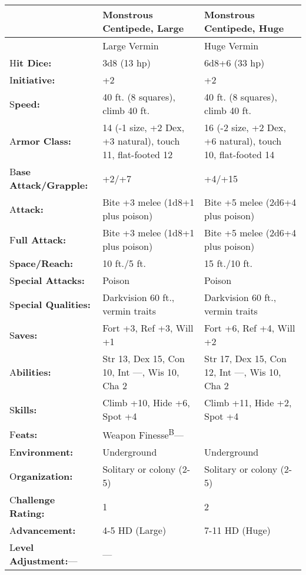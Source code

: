 \documentclass{article}
\begin{document}
\vspace{12pt}
\begin{tabular}{|>{\raggedright}p{59pt}|>{\raggedright}p{127pt}|>{\raggedright}p{127pt}|}
\hline
  & M\textbf{onstrous Centipede, Large} & M\textbf{onstrous Centipede, Huge}\tabularnewline
\hline
  & Large Vermin & Huge Vermin\tabularnewline
\hline
H\textbf{it Dice:} & 3d8 (13 hp) & 6d8+6 (33 hp)\tabularnewline
\hline
I\textbf{nitiative:} & +2 & +2\tabularnewline
\hline
S\textbf{peed:} & 40 ft. (8 squares), climb 40 ft. & 40 ft. (8 squares), climb 
40 ft.\tabularnewline
\hline
A\textbf{rmor Class:} & 14 (-1 size, +2 Dex, +3 natural), touch 11, flat-footed 
12 & 16 (-2 size, +2 Dex, +6 natural), touch 10, flat-footed 14\tabularnewline
\hline
B\textbf{ase Attack/Grapple:} & +2/+7 & +4/+15\tabularnewline
\hline
A\textbf{ttack:} & Bite +3 melee (1d8+1 plus poison) & Bite +5 melee (2d6+4 plus 
poison)\tabularnewline
\hline
F\textbf{ull Attack:} & Bite +3 melee (1d8+1 plus poison) & Bite +5 melee (2d6+4 
plus poison)\tabularnewline
\hline
S\textbf{pace/Reach:} & 10 ft./5 ft. & 15 ft./10 ft.\tabularnewline
\hline
S\textbf{pecial Attacks:} & Poison & Poison\tabularnewline
\hline
S\textbf{pecial Qualities:} & Darkvision 60 ft., vermin traits & Darkvision 60 
ft., vermin traits\tabularnewline
\hline
S\textbf{aves:} & Fort +3, Ref +3, Will +1 & Fort +6, Ref +4, Will +2\tabularnewline
\hline
A\textbf{bilities:} & Str 13, Dex 15, Con 10, Int ---, Wis 10, Cha 2 & Str 17, 
Dex 15, Con 12, Int ---, Wis 10, Cha 2\tabularnewline
\hline
S\textbf{kills:} & Climb +10, Hide +6, Spot +4 & Climb +11, Hide +2, Spot +4\tabularnewline
\hline
F\textbf{eats:} & Weapon Finesse\textsuperscript{B}--- & \tabularnewline
\hline
E\textbf{nvironment:} & Underground & Underground\tabularnewline
\hline
O\textbf{rganization:} & Solitary or colony (2-5) & Solitary or colony (2-5)\tabularnewline
\hline
C\textbf{hallenge Rating:} & 1 & 2\tabularnewline
\hline
A\textbf{dvancement:} & 4-5 HD (Large) & 7-11 HD (Huge)\tabularnewline
\hline
L\textbf{evel Adjustment:}--- & --- & \tabularnewline
\hline
\end{tabular}
\end{document}
